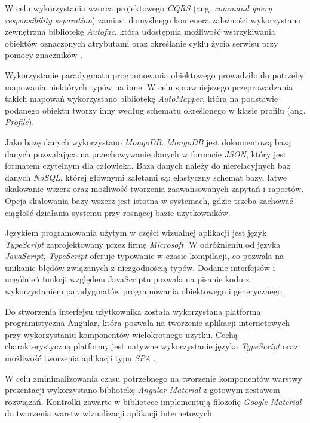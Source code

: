 \documentclass[a4paper,twoside,12pt]{book}
\newcommand{\obcy}[1]{\emph{#1}}
\newcommand{\ang}[1]{{\selectlanguage{british}\obcy{#1}}}
\begin{document}
	W celu wykorzystania wzorca projektowego \textit{CQRS} (ang. \ang{command query responsibility separation}) zamiast domyślnego kontenera zależności wykorzystano zewnętrzną bibliotekę \textit{Autofac}, która udostępnia możliwość wstrzykiwania obiektów oznaczonych atrybutami oraz określanie cyklu życia serwisu przy pomocy znaczników \cite{bib:autofactag}.
	
	Wykorzystanie paradygmatu programowania obiektowego prowadziło do potrzeby mapowania niektórych typów na inne. W celu sprawniejszego przeprowadzania takich mapowań wykorzystano bibliotekę \textit{AutoMapper}, która na podstawie podanego obiektu tworzy inny według schematu określonego w klasie profilu (ang. \ang{Profile}).
	
	Jako bazę danych wykorzystano \textit{MongoDB}. \textit{MongoDB} jest dokumentową bazą danych pozwalająca na przechowywanie danych w formacie \textit{JSON}, który jest formatem czytelnym dla człowieka. Baza danych należy do nierelacyjnych baz danych \textit{NoSQL}, której głównymi zaletami są: elastyczny schemat bazy, łatwe skalowanie wszerz oraz możliwość tworzenia zaawansowanych zapytań i raportów\cite {bib:mongodb_guide}. Opcja skalowania bazy wszerz jest istotna w systemach, gdzie trzeba zachować ciągłość działania systemu przy rosnącej bazie użytkowników.
	
	Językiem programowania użytym w części wizualnej aplikacji jest język \textit{TypeScript} zaprojektowany przez firmę \textit{Microsoft}. W odróżnieniu od języka \textit{JavaScript}, \textit{TypeScript} oferuje typowanie w czasie kompilacji, co pozwala na unikanie błędów związanych z niezgodnością typów. Dodanie interfejsów i uogólnień funkcji względem JavaScriptu pozwala na pisanie kodu z wykorzystaniem paradygmatów programowania obiektowego i generycznego \cite {bib:typescript}.
	
	Do stworzenia interfejsu użytkownika została wykorzystana platforma programistyczna Angular, która pozwala na tworzenie aplikacji internetowych przy wykorzystaniu komponentów wielokrotnego użytku. Cechą charakterystyczną platformy jest natywne wykorzystanie języka \textit{TypeScript} oraz możliwość tworzenia aplikacji typu \textit{SPA} \cite{bib:anuglar} \cite{bib:typescript}.
	
	W celu zminimalizowania czasu potrzebnego na tworzenie komponentów warstwy prezentacji wykorzystano bibliotekę \textit{Angular Material} z gotowym zestawem rozwiązań. Kontrolki zawarte w bibliotece implementują filozofię \textit{Google Material} do tworzenia warstw wizualizacji aplikacji internetowych.
	
\end{document}
